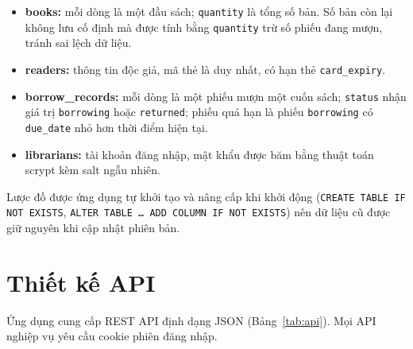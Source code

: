 \documentclass[../main.tex]{subfiles}
\begin{document}
\begin{itemize}
    \item \textbf{books:} mỗi dòng là một đầu sách; \texttt{quantity} là tổng số bản. Số bản còn lại không lưu cố định mà được tính bằng \texttt{quantity} trừ số phiếu đang mượn, tránh sai lệch dữ liệu.
    \item \textbf{readers:} thông tin độc giả, mã thẻ là duy nhất, có hạn thẻ \texttt{card\_expiry}.
    \item \textbf{borrow\_records:} mỗi dòng là một phiếu mượn một cuốn sách; \texttt{status} nhận giá trị \texttt{borrowing} hoặc \texttt{returned}; phiếu quá hạn là phiếu \texttt{borrowing} có \texttt{due\_date} nhỏ hơn thời điểm hiện tại.
    \item \textbf{librarians:} tài khoản đăng nhập, mật khẩu được băm bằng thuật toán scrypt kèm salt ngẫu nhiên.
\end{itemize}
Lược đồ được ứng dụng tự khởi tạo và nâng cấp khi khởi động (\texttt{CREATE TABLE IF NOT EXISTS}, \texttt{ALTER TABLE \ldots{} ADD COLUMN IF NOT EXISTS}) nên dữ liệu cũ được giữ nguyên khi cập nhật phiên bản.

\section{Thiết kế API}
Ứng dụng cung cấp REST API định dạng JSON (Bảng~\ref{tab:api}). Mọi API nghiệp vụ yêu cầu cookie phiên đăng nhập.
\end{document}
